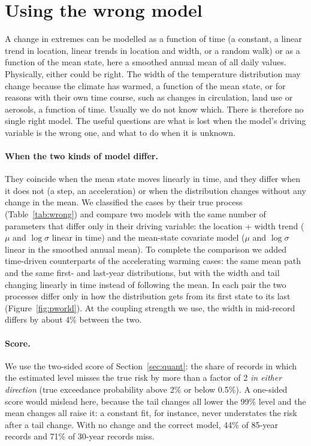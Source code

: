 \documentclass[11pt]{article}
\begin{document}
\section{Using the wrong model}\label{sec:wrong}

A change in extremes can be modelled as a function of time (a constant, a linear trend in location,
linear trends in location and width, or a random walk) or as a function of the mean state, here a
smoothed annual mean of all daily values. Physically, either could be right. The width of the
temperature distribution may change because the climate has warmed, a function of the mean state,
or for reasons with their own time course, such as changes in circulation, land use or aerosols, a
function of time. Usually we do not know which. There is therefore no single right model. The useful
questions are what is lost when the model's driving variable is the wrong one, and what to do when
it is unknown.

\paragraph{When the two kinds of model differ.}
They coincide when the mean state moves linearly in time, and they differ when it does not (a step,
an acceleration) or when the distribution changes without any change in the mean. We classified the
cases by their true process (Table~\ref{tab:wrong}) and compare two models with the same number of
parameters that differ only in their driving variable: the location + width trend ($\mu$ and
$\log\sigma$ linear in time) and the mean-state covariate model ($\mu$ and $\log\sigma$ linear in the
smoothed annual mean). To complete the comparison we added time-driven counterparts of the
accelerating warming cases: the same mean path and the same first- and last-year distributions, but
with the width and tail changing linearly in time instead of following the mean. In each pair the
two processes differ only in how the distribution gets from its first state to its last
(Figure~\ref{fig:pworld}). At the coupling strength we use, the width in mid-record differs by
about 4\% between the two.

\paragraph{Score.}
We use the two-sided score of Section~\ref{sec:quant}: the share of records in which the estimated
level misses the true risk by more than a factor of 2 \emph{in either direction} (true exceedance
probability above 2\% or below 0.5\%). A one-sided score would mislead here, because the tail
changes all lower the 99\% level and the mean changes all raise it: a constant fit, for instance,
never understates the risk after a tail change. With no change and the correct model, 44\% of
85-year records and 71\% of 30-year records miss.
\end{document}

